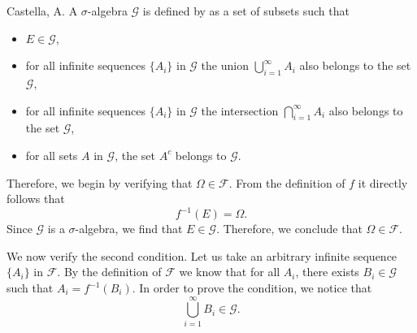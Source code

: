 \begin{solution}[2.4]{Castella, A.} 
    A $\sigma$-algebra $\mathcal{G}$ is defined by as a set of subsets such that
    \begin{itemize}
        \item $E \in \mathcal{G}$,
        \item for all infinite sequences $\{A_i\}$ in $\mathcal{G}$ the union $\bigcup_{i=1}^\infty A_i$ also belongs to the set $\mathcal{G}$,
        \item for all infinite sequences $\{A_i\}$ in $\mathcal{G}$ the intersection $\bigcap_{i=1}^\infty A_i$ also belongs to the set $\mathcal{G}$,
        \item for all sets $A$ in $\mathcal{G}$, the set $A^c$ belongs to $\mathcal{G}$.
    \end{itemize}
    Therefore, we begin by verifying that $\Omega \in \mathcal{F}$. From the definition of $f$ it directly follows that
    $$
        f^{-1}(E) = \Omega.
    $$
    Since $\mathcal{G}$ is a $\sigma$-algebra, we find that $E \in \mathcal{G}$. Therefore, we conclude that $\Omega \in \mathcal{F}$.
    
    We now verify the second condition. Let us take an arbitrary infinite sequence $\{A_i\}$ in $\mathcal{F}$. By the definition of $\mathcal{F}$ we know that for all $A_i$, there exists $B_i \in \mathcal{G}$ such that $A_i = f^{-1}(B_i)$. In order to prove the condition, we notice that
    $$
        \bigcup_{i=1}^\infty B_i \in \mathcal{G}.
    $$
    

\end{solution}
